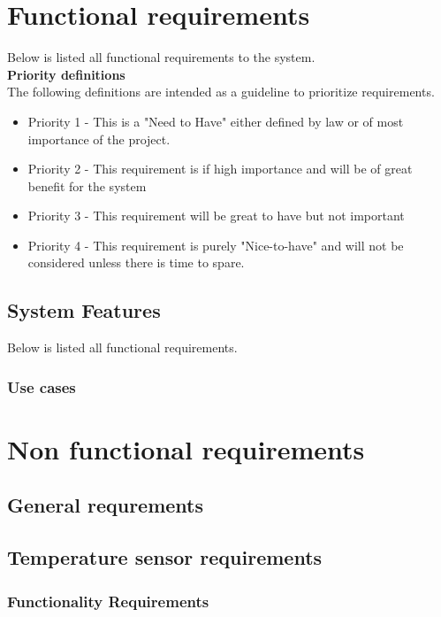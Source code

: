 \section{Functional requirements}
Below is listed all functional requirements to the system.\\
\textbf{\large{Priority definitions}}\\
The following definitions are intended as a guideline to prioritize requirements.
\begin{itemize}[noitemsep,nolistsep]
\item Priority 1 - This is a "Need to Have" either defined by law or of most importance of the project.
\item Priority 2 - This requirement is if high importance and will be of great benefit for the system
\item Priority 3 - This requirement will be great to have but not important
\item Priority 4 - This requirement is purely "Nice-to-have" and will not be considered unless there is time to spare.
\end{itemize}

\subsection{System Features}
Below is listed all functional requirements.

\subsubsection{Use cases}
\section{Non functional requirements}

\subsection{General requrements}

\subsection{Temperature sensor requirements}

\subsubsection{Functionality Requirements}

